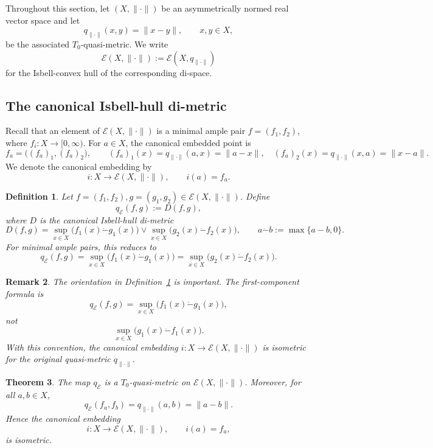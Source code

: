 \documentclass[preprint,12pt]{elsarticle}
\numberwithin{equation}{section}
\newtheorem{theorem}{Theorem}[section]
\newtheorem{definition}[theorem]{Definition}
\newtheorem{remark}[theorem]{Remark}
\newcommand{\E}{\mathcal{E}}
\begin{document}
Throughout this section, let \((X,\|\cdot\|)\) be an asymmetrically normed real
vector space and let
\[
q_{\|\cdot\|}(x,y)=\|x-y\|,\qquad x,y\in X,
\]
be the associated \(T_{0}\)-quasi-metric.  We write
\[
\E(X,\|\cdot\|):=\mathcal E(X,q_{\|\cdot\|})
\]
for the Isbell-convex hull of the corresponding di-space.

\subsection{The canonical Isbell-hull di-metric}

Recall that an element of \(\E(X,\|\cdot\|)\) is a minimal ample pair
\(f=(f_1,f_2)\), where \(f_i:X\to[0,\infty)\).  For \(a\in X\), the canonical
embedded point is
\[
f_a=\bigl((f_a)_1,(f_a)_2\bigr),
\qquad
(f_a)_1(x)=q_{\|\cdot\|}(a,x)=\|a-x\|,
\quad
(f_a)_2(x)=q_{\|\cdot\|}(x,a)=\|x-a\|.
\]
We denote the canonical embedding by
\[
i:X\longrightarrow \E(X,\|\cdot\|),\qquad i(a)=f_a.
\]

\begin{definition}\label{def:qE}
Let \(f=(f_1,f_2),g=(g_1,g_2)\in \E(X,\|\cdot\|)\).  Define
\[
q_{\E}(f,g):=D(f,g),
\]
where \(D\) is the canonical Isbell-hull di-metric
\[
D(f,g)
=
\sup_{x\in X}\bigl(f_1(x)\dot{-}g_1(x)\bigr)
\vee
\sup_{x\in X}\bigl(g_2(x)\dot{-}f_2(x)\bigr),
\qquad
a\dot{-}b:=\max\{a-b,0\}.
\]
For minimal ample pairs, this reduces to
\[
q_{\E}(f,g)
=
\sup_{x\in X}\bigl(f_1(x)\dot{-}g_1(x)\bigr)
=
\sup_{x\in X}\bigl(g_2(x)\dot{-}f_2(x)\bigr).
\]
\end{definition}

\begin{remark}\label{rem:qEorientation}
The orientation in Definition~\ref{def:qE} is important.  The first-component
formula is
\[
q_{\E}(f,g)=\sup_{x\in X}\bigl(f_1(x)\dot{-}g_1(x)\bigr),
\]
not
\[
\sup_{x\in X}\bigl(g_1(x)\dot{-}f_1(x)\bigr).
\]
With this convention, the canonical embedding \(i:X\to\E(X,\|\cdot\|)\) is
isometric for the original quasi-metric \(q_{\|\cdot\|}\).
\end{remark}

\begin{theorem}\label{thm:qEisometric}
The map \(q_{\E}\) is a \(T_{0}\)-quasi-metric on \(\E(X,\|\cdot\|)\).
Moreover, for all \(a,b\in X\),
\[
q_{\E}(f_a,f_b)=q_{\|\cdot\|}(a,b)=\|a-b\|.
\]
Hence the canonical embedding
\[
i:X\to\E(X,\|\cdot\|),\qquad i(a)=f_a,
\]
is isometric.
\end{theorem}
\end{document}

